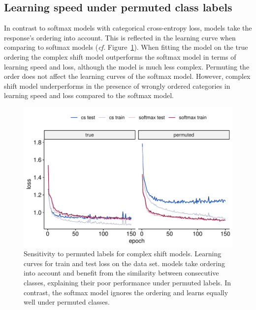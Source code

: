 \documentclass[article,nojss,shortnames]{jss}\usepackage[]{graphicx}\usepackage[]{color}
\begin{document}
\begin{appendix}
\section{Learning speed under permuted class labels} \label{app:permute}

In contrast to softmax models with categorical cross-entropy loss, 
models take the response's ordering into account.
This is reflected in the learning curve when comparing  to softmax
models (\emph{cf.} Figure~\ref{fig:permcs}).
When fitting the model on the true ordering the complex shift model outperforms
the softmax model in terms of learning speed and loss, although the model is
much less complex.
Permuting the order does not affect the learning curves of the softmax model.
However, complex shift model underperforms in the presence of wrongly ordered
categories in learning speed and loss compared to the softmax model.

\begin{figure}
\centering
\includegraphics[width=1\textwidth]{figures/permuted-labels-cs}
\caption{Sensitivity to permuted labels for  complex shift models.
Learning curves for train and test loss on the  data set.
 models take ordering into account and benefit from the similarity
between consecutive classes, explaining their poor performance under permuted
labels. In contrast, the softmax model ignores the ordering and learns equally
well under permuted classes.} \label{fig:permcs}
\end{figure}
\end{appendix}

\clearpage


\end{document}

